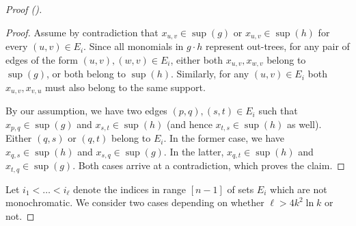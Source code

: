\documentclass[11pt,a4paper]{article}
\begin{document}
\begin{proof}[Proof ()]
    \begin{proof}
        Assume by contradiction that $x_{u, v} \in \sup(g)$ or $x_{u, v} \in \sup(h)$ for every $(u, v) \in E_i$.
        Since all monomials in $g \cdot h$ represent out-trees, for any pair of edges of the form $(u, v), (w, v) \in E_i$, either both $x_{u, v}, x_{w, v}$ belong to $\sup(g)$, or both belong to $\sup(h)$. Similarly, for any $(u, v) \in E_i$ both $x_{u, v}, x_{v, u}$ must also belong to the same support.
        
        By our assumption, we have two edges $(p, q), (s, t) \in E_i$ such that $x_{p, q} \in \sup(g)$ and $x_{s, t} \in \sup(h)$ (and hence $x_{t, s} \in \sup(h)$ as well). Either $(q, s)$ or $(q, t)$ belong to $E_i$. In the former case, we have $x_{q, s} \in \sup(h)$ and $x_{s, q} \in \sup(g)$. In the latter, $x_{q, t} \in \sup(h)$ and $x_{t, q} \in \sup(g)$. Both cases arrive at a contradiction, which proves the claim.
    \end{proof}

    
    Let $i_1 < \dots < i_\ell$ denote the indices in range $[n - 1]$ of sets $E_i$ which are not monochromatic. We consider two cases depending on whether $\ell > 4k^2 \ln k$ or not.


\end{proof}
\end{document}
